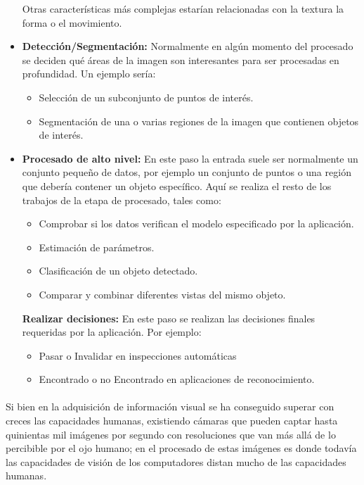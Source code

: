 \documentclass[a4paper,12pt,titlepage,final]{book}
\begin{document}
\begin{itemize}
  Otras características más complejas estarían relacionadas con la textura la
  forma o el movimiento.
  
  \item \textbf{Detección/Segmentación:} Normalmente en algún momento del
  procesado se deciden qué áreas de la imagen son interesantes para ser
  procesadas en profundidad. Un ejemplo sería:
  
  \begin{itemize}
    \item Selección de un subconjunto de puntos de interés.
    \item Segmentación de una o varias regiones de la imagen que contienen objetos
    de interés.
  \end{itemize}
  
  \item \textbf{Procesado de alto nivel:} En este paso la entrada suele ser
  normalmente un conjunto pequeño de datos, por ejemplo un conjunto de puntos o una región que
  debería contener un objeto específico. Aquí se realiza el resto de los trabajos de
  la etapa de procesado, tales como:
  
  \begin{itemize}
    \item Comprobar si los datos verifican el modelo especificado por la aplicación.
    \item Estimación de parámetros.
    \item Clasificación de un objeto detectado.
    \item Comparar y combinar diferentes vistas del mismo objeto.
  \end{itemize}
  
  \textbf{Realizar decisiones:} En este paso se realizan las decisiones finales
  requeridas por la aplicación. Por ejemplo:
  
  \begin{itemize}
    \item Pasar o Invalidar en inspecciones automáticas
    \item Encontrado o no Encontrado en aplicaciones de reconocimiento.
  \end{itemize}
  
\end{itemize}

\paragraph{}
Si bien en la adquisición de información visual se ha conseguido superar con
creces las capacidades humanas, existiendo cámaras que pueden captar hasta
quinientas mil imágenes por segundo con resoluciones que van más allá de lo
percibible por el ojo humano; en el procesado de estas imágenes es donde todavía
las capacidades de visión de los computadores distan mucho de las capacidades
humanas.
\end{document}
